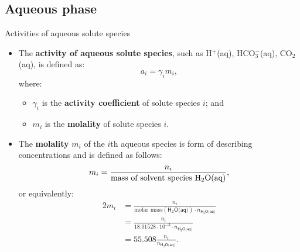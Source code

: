 %
\subsection{Aqueous phase}
%
%
%
\begin{frame}{Activities of aqueous solute species}
%
\lcol
\begin{itemize}
\item The \alert{\textbf{activity of aqueous solute species}}, such as H$^{+}$(aq), HCO$_{3}^{-}$(aq),
CO$_{2}$(aq), is defined as:
\[
a_{i}=\gamma_{i}m_{i},
\]
where:
\begin{itemize}
\item $\gamma_{i}$ is the \textbf{activity coefficient} of solute species
$i$; and
\item $m_{i}$ is the \textbf{molality} of solute species $i$.	
\end{itemize}
\end{itemize}
\rcol
\pause
\begin{itemize}
\item The  \alert{\textbf{molality}} $m_{i}$ of the $i$th aqueous species is form of describing concentrations and is defined as follows:
\[
m_{i}=\frac{n_{i}}{\text{mass of solvent species H\ensuremath{_{2}}O(aq)}},
\]
or equivalently:
\begin{alignat*}{2}
m_{i} & =  \frac{n_{i}}{\mbox{molar mass}(\mathsf{H_{2}O\text{(aq)}}) \cdot n_{\mathsf{H_{2}O\text{(aq)}}}} \\
         & =  \frac{n_{i}}{18.01528 \cdot 10^{-3} \cdot  n_{\mathsf{H_{2}O\text{(aq)}}}} \\
         & = 55.508\frac{n_{i}}{n_{\mathsf{H_{2}O\text{(aq)}}}}.
\end{alignat*}
\end{itemize}
\ecol
\end{frame}
%
